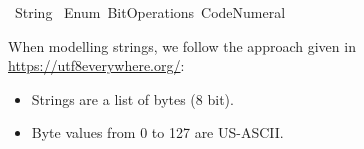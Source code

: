 %
\begin{isabellebody}%
%
%
\isadelimdocument
%
\endisadelimdocument
%
\isatagdocument
%
\isamarkuptrue%
%
\endisatagdocument
{\isafolddocument}%
%
\isadelimdocument
%
\endisadelimdocument
%
\isadelimtheory
%
\endisadelimtheory
%
\isatagtheory
{}\isamarkupfalse%
\ String\isanewline
{}\ Enum\ Bit{\isacharunderscore}{\kern0pt}Operations\ Code{\isacharunderscore}{\kern0pt}Numeral\isanewline
{}%
\endisatagtheory
{\isafoldtheory}%
%
\isadelimtheory
%
\endisadelimtheory
%
\isadelimdocument
%
\endisadelimdocument
%
\isatagdocument
%
\isamarkuptrue%
%
\endisatagdocument
{\isafolddocument}%
%
\isadelimdocument
%
\endisadelimdocument
%
\begin{isamarkuptext}%
When modelling strings, we follow the approach given
in \url{https://utf8everywhere.org/}:

%
\begin{itemize}%
\item Strings are a list of bytes (8 bit).

\item Byte values from 0 to 127 are US-ASCII.


\end{itemize}
\end{isamarkuptext}
\end{isabellebody}
